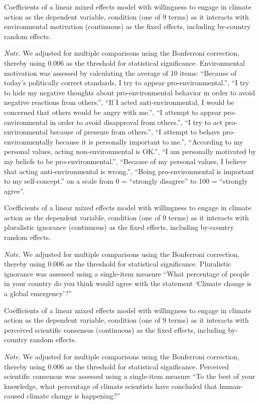 \begin{table}[H] 
\caption{Coefficients of a linear mixed effects model with willingness to engage in climate action as the dependent variable, condition (one of 9 terms) as it interacts with environmental motivation (continuous) as the fixed effects, including by-country random effects.}
 
\end{table}
\textit{Note.} We adjusted for multiple comparisons using the Bonferroni correction, thereby using 0.006 as the threshold for statistical significance. Environmental motivation was assessed by calculating the average of 10 items: “Because of today's politically correct standards, I try to appear pro-environmental.”, “I try to hide my negative thoughts about pro-environmental behavior in order to avoid negative reactions from others.”, “If I acted anti-environmental, I would be concerned that others would be angry with me.”, “I attempt to appear pro-environmental in order to avoid disapproval from others.”, “I try to act pro-environmental because of pressure from others.”, “I attempt to behave pro-environmentally because it is personally important to me.”, “According to my personal values, acting non-environmental is OK.”, “I am personally motivated by my beliefs to be pro-environmental.”, “Because of my personal values, I believe that acting anti-environmental is wrong.”, “Being pro-environmental is important to my self-concept.” on a scale from 0 = “strongly disagree” to 100 = “strongly agree”.

\begin{table}[H] 
\caption{Coefficients of a linear mixed effects model with willingness to engage in climate action as the dependent variable, condition (one of 9 terms) as it interacts with pluralistic ignorance (continuous) as the fixed effects, including by-country random effects.}
 
\end{table}
\textit{Note.} We adjusted for multiple comparisons using the Bonferroni correction, thereby using 0.006 as the threshold for statistical significance. Pluralistic ignorance was assessed using a single-item measure “What percentage of people in your country do you think would agree with the statement ‘Climate change is a global emergency’?”

\begin{table}[H] 
\caption{Coefficients of a linear mixed effects model with willingness to engage in climate action as the dependent variable, condition (one of 9 terms) as it interacts with perceived scientific consensus (continuous) as the fixed effects, including by-country random effects.}
 
\end{table}
\textit{Note.} We adjusted for multiple comparisons using the Bonferroni correction, thereby using 0.006 as the threshold for statistical significance. Perceived scientific consensus was assessed using a single-item measure “To the best of your knowledge, what percentage of climate scientists have concluded that human-caused climate change is happening?”


